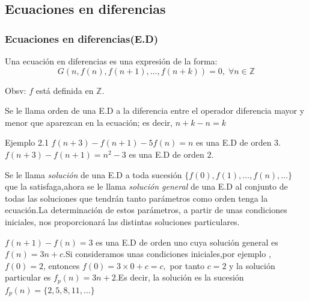 \documentclass[spanish, utf8,handout]{beamer} %
\theoremstyle{definition}
\begin{document}
\subsection{Ecuaciones en diferencias}
\begin{frame}
	\frametitle{Ecuaciones en diferencias(E.D)}
	\begin{definition}[1]
	Una ecuación en diferencias es una expresión de la forma:
	$$
	G(n,f(n),f(n+1),\ldots,f(n+k))=0, \; \forall n \in \mathbb{Z}
	$$

	\end{definition}
\begin{alertblock}{Obsv:}
$ f $ está definida en $ \mathbb{Z} .$
\end{alertblock}
	\begin{definition}[2]
	Se le llama orden de una E.D a la diferencia entre el operador diferencia mayor y menor que aparezcan en la ecuación; es decir, $ n+k-n=k $
	\end{definition}
\begin{block}{Ejemplo 2.1}
	$ f(n+3)-f(n+1)-5f(n)=n $ es una E.D de orden $ 3 .$\\$ f(n+3)-f(n+1)=n^{2}-3 $ es una E.D de orden $ 2 .$
\end{block}
\end{frame}
\begin{frame}{}
\begin{definition}[3]
Se le llama \emph{solución} de una E.D a toda sucesión $  \{f(0),f(1),\ldots,f(n),\ldots \} $ que la satisfaga,ahora se le llama \emph{solución general} de una E.D al conjunto de todas las soluciones que tendrán tanto parámetros como orden tenga la ecuación.La determinación de estos parámetros, a partir de unas
	condiciones iniciales, nos proporcionará las distintas soluciones particulares.
\end{definition}
\begin{example}[]
	$ f(n+1)-f(n)=3 $ es una E.D de orden uno cuya solución general es $ f(n)=3n+c $.Si consideramos unas condiciones iniciales,por ejemplo ,$ f(0)=2$, entonces $ f(0)=3\times0+c=c,$ por tanto $ c=2 $ y la solución particular es $ f_{p}(n)=3n+2.$Es decir, la solución es la sucesión $ f_{p}(n)=\{2,5,8,11,\ldots\} $
\end{example}
\end{frame}
\end{document}
